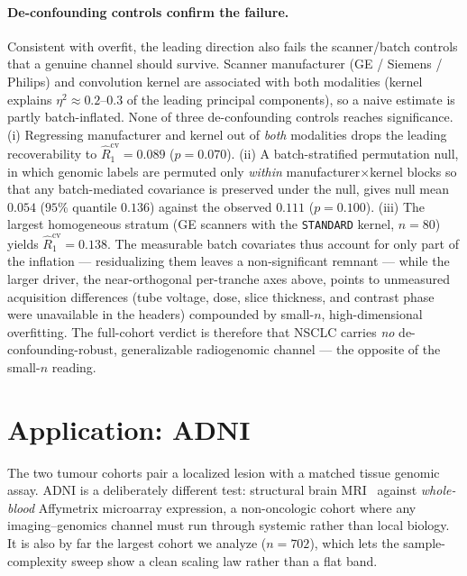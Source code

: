 \documentclass{article}
\begin{document}
\paragraph{De-confounding controls confirm the failure.}
Consistent with overfit, the leading direction also fails the scanner/batch
controls that a genuine channel should survive. Scanner manufacturer
(GE / Siemens / Philips) and convolution kernel are associated with both
modalities (kernel explains $\eta^2 \approx 0.2$--$0.3$ of the leading principal
components), so a naive estimate is partly batch-inflated. None of three
de-confounding controls reaches significance. (i) Regressing manufacturer and
kernel out of \emph{both} modalities drops the leading recoverability to
$\hat R_1^{\mathrm{cv}} = 0.089$ ($p = 0.070$). (ii) A batch-stratified
permutation null, in which genomic labels are permuted only \emph{within}
manufacturer$\times$kernel blocks so that any batch-mediated covariance is
preserved under the null, gives null mean $0.054$ ($95\%$ quantile $0.136$)
against the observed $0.111$ ($p = 0.100$). (iii) The largest homogeneous
stratum (GE scanners with the \texttt{STANDARD} kernel, $n = 80$) yields
$\hat R_1^{\mathrm{cv}} = 0.138$. The measurable batch covariates thus account
for only part of the inflation --- residualizing them leaves a non-significant
remnant --- while the larger driver, the near-orthogonal per-tranche axes above,
points to unmeasured acquisition differences (tube voltage, dose, slice
thickness, and contrast phase were unavailable in the headers) compounded by
small-$n$, high-dimensional overfitting. The full-cohort verdict is therefore
that NSCLC carries \emph{no} de-confounding-robust, generalizable radiogenomic
channel --- the opposite of the small-$n$ reading.

\section{Application: ADNI}
\label{sec:adni}

The two tumour cohorts pair a localized lesion with a matched tissue genomic
assay. ADNI is a deliberately different test: structural brain
MRI~\citep{petersen2010adni} against \emph{whole-blood} Affymetrix microarray
expression, a non-oncologic cohort where any imaging--genomics channel must run
through systemic rather than local biology. It is also by far the largest
cohort we analyze ($n = 702$), which lets the sample-complexity sweep show a
clean scaling law rather than a flat band.
\end{document}
